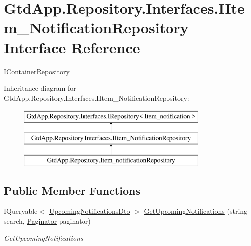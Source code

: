 \hypertarget{interface_gtd_app_1_1_repository_1_1_interfaces_1_1_i_item___notification_repository}{}\section{Gtd\+App.\+Repository.\+Interfaces.\+I\+Item\+\_\+\+Notification\+Repository Interface Reference}
\label{interface_gtd_app_1_1_repository_1_1_interfaces_1_1_i_item___notification_repository}


\mbox{\hyperlink{interface_gtd_app_1_1_repository_1_1_interfaces_1_1_i_container_repository}{I\+Container\+Repository}}  


Inheritance diagram for Gtd\+App.\+Repository.\+Interfaces.\+I\+Item\+\_\+\+Notification\+Repository\+:\begin{figure}[H]
\begin{center}
\leavevmode
\includegraphics[height=3.000000cm]{interface_gtd_app_1_1_repository_1_1_interfaces_1_1_i_item___notification_repository}
\end{center}
\end{figure}
\subsection*{Public Member Functions}
\begin{DoxyCompactItemize}
\item 
I\+Queryable$<$ \mbox{\hyperlink{class_gtd_app_1_1_data_1_1_dto_1_1_upcoming_notifications_dto}{Upcoming\+Notifications\+Dto}} $>$ \mbox{\hyperlink{interface_gtd_app_1_1_repository_1_1_interfaces_1_1_i_item___notification_repository_aabde198f24c18ac864ceb40309f634c8}{Get\+Upcoming\+Notifications}} (string search, \mbox{\hyperlink{class_gtd_app_1_1_repository_1_1_paginator}{Paginator}} paginator)
\begin{DoxyCompactList}\small\item\em Get\+Upcoming\+Notifications \end{DoxyCompactList}\end{DoxyCompactItemize}


